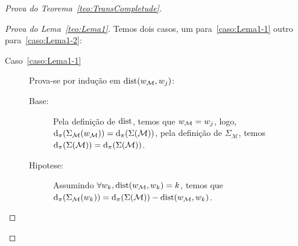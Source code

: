 \begin{apendicesenv}
\begin{proof}[Prova do Teorema~\ref{teo:TransCompletude}]
            \begin{proof}[Prova do Lema~\ref{teo:Lema1}]
                Temos dois casos, um para~\ref{caso:Lema1-1} outro para~\ref{caso:Lema1-2}:
                \begin{description}
                    \item[Caso~\ref{caso:Lema1-1}] Prova-se por indução em \(\operatorname{dist}(w_{\mathcal{M}}, w_j)\):
                        \begin{description}
                            \item[Base:] Pela definição de \(\operatorname{dist}\), temos que \(w_{\mathcal{M}} = w_j\), logo, \(\operatorname{d}_{\pi}(\Sigma_{\mathcal{M}}(w_{\mathcal{M}})) = \operatorname{d}_{\pi}(\Sigma(\mathcal{M}))\),
                            pela definição de \(\Sigma_{\mathcal{M}}\), temos \(\operatorname{d}_{\pi}(\Sigma(\mathcal{M})) = \operatorname{d}_{\pi}(\Sigma(\mathcal{M}))\).

                            \item[Hipotese:] Assumindo \(\forall w_k, \operatorname{dist}(w_{\mathcal{M}}, w_k) = k\),
                                temos que \(\operatorname{d}_{\pi}(\Sigma_{\mathcal{M}}(w_k)) = \operatorname{d}_{\pi}(\Sigma(\mathcal{M})) - \operatorname{dist}(w_{\mathcal{M}}, w_k)\).


\end{description}
\end{description}
\end{proof}
\end{proof}
\end{apendicesenv}
